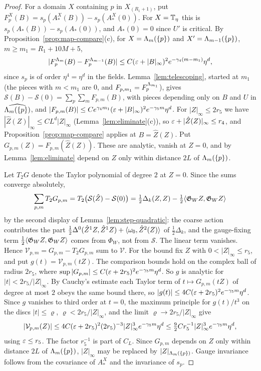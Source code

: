\begin{proof}
For a domain $X$ containing $p$ in $X_{(R_1+1)}$, put $F^X_p(B)=s_p(A^X_*(B))-s_p(A^X_*(0))$. For $X=\mathbb T_\eta$ this is $s_p(A_*(B))-s_p(A_*(0))$, and $A_*(0)=0$ since $U'$ is critical. By Proposition~\ref{prop:map-compare}(c), for $X=\Lambda_m(\{p\})$ and $X'=\Lambda_{m-1}(\{p\})$, $m\ge m_1=R_1+10M+5$,
\[
|F^{\Lambda_m}_p(B)-F^{\Lambda_{m-1}}_p(B)|\le C(\varepsilon+|B|_\infty)^2e^{-\gamma_4(m-m_1)}\eta^d ,
\]
since $s_p$ is of order $\eta^4=\eta^d$ in the fields. Lemma~\ref{lem:telescoping}, started at $m_1$ (the pieces with $m<m_1$ are $0$, and $F_{p,m_1}=F^{\Lambda_{m_1}}_p$), gives $\mathcal S(B)-\mathcal S(0)=\sum_p\sum_mF_{p,m}(B)$, with pieces depending only on $B$ and $U$ in $\widehat{\Lambda_m(\{p\})}$, and $|F_{p,m}(B)|\le Ce^{\gamma_4m_1}(\varepsilon+|B|_\infty)^2e^{-\gamma_5m}\eta^d$. For $|Z|_\infty\le2r_5$ we have $|\hat Z(Z)|_\infty\le CL^d|Z|_\infty$ (Lemma~\ref{lem:eliminate}(c)), so $\varepsilon+|\hat Z(Z)|_\infty\le r_4$, and Proposition~\ref{prop:map-compare} applies at $B=\hat Z(Z)$. Put $G_{p,m}(Z)=F_{p,m}(\hat Z(Z))$. These are analytic, vanish at $Z=0$, and by Lemma~\ref{lem:eliminate} depend on $Z$ only within distance $2L$ of $\Lambda_m(\{p\})$.

Let $T_2G$ denote the Taylor polynomial of degree $2$ at $Z=0$. Since the sums converge absolutely,
\[
\sum_{p,m}T_2G_{p,m}=T_2\big(\mathcal S(\hat Z)-\mathcal S(0)\big)=\tfrac12\Delta_k(Z,Z)-\tfrac12\langle \mathfrak G_WZ,\mathfrak G_WZ\rangle
\]
by the second display of Lemma~\ref{lem:step-quadratic}: the coarse action contributes the part $\frac12\Delta^0(\hat Z^1Z,\hat Z^1Z)+\langle \omega_0,\hat Z^2(Z)\rangle$ of $\frac12\Delta_k$, and the gauge-fixing term $\frac12\langle \mathfrak G_WZ,\mathfrak G_WZ\rangle$ comes from $\Phi_W$, not from $\mathcal S$. The linear term vanishes. Hence $\mathcal V_{p,m}=G_{p,m}-T_2G_{p,m}$ sum to $\mathcal V$. For the bound fix $Z$ with $0<|Z|_\infty\le r_5$, and put $g(t)=\mathcal V_{p,m}(tZ)$. The comparison bounds hold on the complex ball of radius $2r_5$, where $\sup|G_{p,m}|\le C(\varepsilon+2r_5)^2e^{-\gamma_5m}\eta^d$. So $g$ is analytic for $|t|<2r_5/|Z|_\infty$. By Cauchy's estimate each Taylor term of $t\mapsto G_{p,m}(tZ)$ of degree at most $2$ obeys the same bound there, so $|g(t)|\le4C(\varepsilon+2r_5)^2e^{-\gamma_5m}\eta^d$. Since $g$ vanishes to third order at $t=0$, the maximum principle for $g(t)/t^3$ on the discs $|t|\le\varrho$, $\varrho<2r_5/|Z|_\infty$, and the limit $\varrho\to2r_5/|Z|_\infty$ give
\[
|\mathcal V_{p,m}(Z)|\le4C(\varepsilon+2r_5)^2(2r_5)^{-3}|Z|_\infty^3e^{-\gamma_5m}\eta^d\le\tfrac92Cr_5^{-1}|Z|_\infty^3e^{-\gamma_5m}\eta^d ,
\]
using $\varepsilon\le r_5$. The factor $r_5^{-1}$ is part of $C_L$. Since $G_{p,m}$ depends on $Z$ only within distance $2L$ of $\Lambda_m(\{p\})$, $|Z|_\infty$ may be replaced by $|Z|_{\Lambda_m(\{p\})}$. Gauge invariance follows from the covariance of $A^X_*$ and the invariance of $s_p$.
\end{proof}

